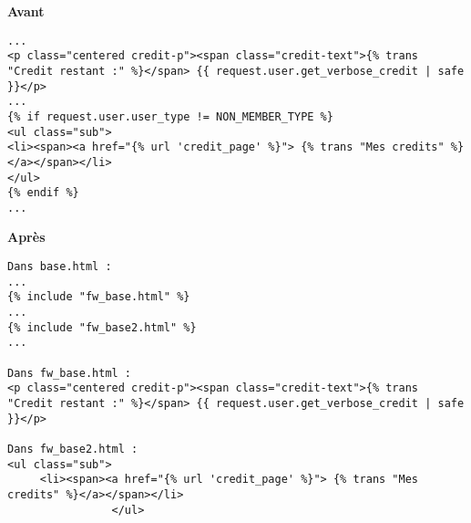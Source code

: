 \begin{minipage}{.5\textwidth}
\begin{center} \textbf{Avant}\end{center}
\begin{lstlisting}
...
<p class="centered credit-p"><span class="credit-text">{% trans "Credit restant :" %}</span> {{ request.user.get_verbose_credit | safe }}</p>
...
{% if request.user.user_type != NON_MEMBER_TYPE %}
<ul class="sub">
<li><span><a href="{% url 'credit_page' %}"> {% trans "Mes credits" %}</a></span></li>
</ul>
{% endif %}
...
\end{lstlisting} 
\end{minipage}
\hspace{0.3cm}
\begin{minipage}{.5\textwidth}
\begin{center} \textbf{Après}\end{center}
\begin{lstlisting}
Dans base.html :
...
{% include "fw_base.html" %}
...
{% include "fw_base2.html" %}
...

Dans fw_base.html : 
<p class="centered credit-p"><span class="credit-text">{% trans "Credit restant :" %}</span> {{ request.user.get_verbose_credit | safe }}</p>

Dans fw_base2.html : 
<ul class="sub">
     <li><span><a href="{% url 'credit_page' %}"> {% trans "Mes credits" %}</a></span></li>
                </ul>

\end{lstlisting} 
\end{minipage}

